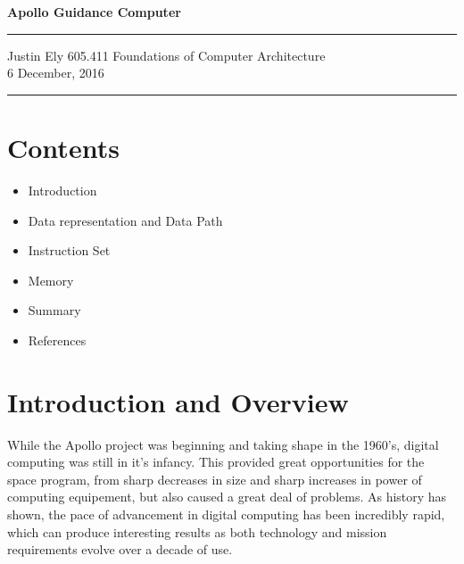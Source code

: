 \documentclass[a4paper,11pt]{article}
\begin{document}
\begin{flushright}

\vspace{1.1cm}

{\bf\Huge Apollo Guidance Computer}

\rule{0.25\linewidth}{0.5pt}


\vspace{0.5cm}
Justin Ely
\linebreak
\newline
\footnotesize{605.411 Foundations of Computer Architecture \\}
\vspace{0.1cm}
6 December, 2016
\end{flushright}

\noindent\rule{\linewidth}{1.0pt}



\section{Contents}
\begin{itemize}
\item Introduction %
\item Data representation and Data Path
\item Instruction Set
\item Memory
\item Summary
\item References
\end{itemize}


\section{Introduction and Overview}

While the Apollo project was beginning and taking shape in the 1960's, digital computing was still in it's infancy.  This provided great opportunities for the space program, from sharp decreases in size and sharp increases in power of computing equipement, but also caused a great deal of problems.  As history has shown, the pace of advancement in digital computing has been incredibly rapid, which can produce interesting results as both technology and mission requirements evolve over a decade of use.  
\end{document}

